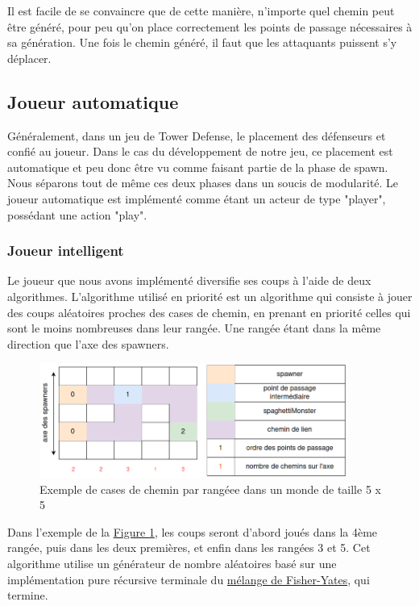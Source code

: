 \documentclass{article}
\begin{document}
Il est facile de se convaincre que de cette manière, n'importe quel chemin peut être généré, pour peu qu'on place correctement les points de passage nécessaires à sa génération.
Une fois le chemin généré, il faut que les attaquants puissent s'y déplacer.

\subsection{Joueur automatique}

Généralement, dans un jeu de Tower Defense, le placement des défenseurs et confié au joueur. Dans le cas du développement de notre jeu, ce placement est automatique et peu donc être vu comme faisant partie de la phase de spawn. Nous séparons tout de même ces deux phases dans un soucis de modularité.
Le joueur automatique est implémenté comme étant un acteur de type "player", possédant une action "play".

\subsubsection{Joueur intelligent}

Le joueur que nous avons implémenté diversifie ses coups à l'aide de deux algorithmes.
L'algorithme utilisé en priorité est un algorithme qui consiste à jouer des coups aléatoires proches des cases de chemin, en prenant en priorité celles qui sont le moins nombreuses dans leur rangée. Une rangée étant dans la même direction que l'axe des spawners.

\begin{figure}[H]
    \centering
    \includegraphics[width = 0.9\textwidth]{points_de_passage_play.png}
    \caption{Exemple de cases de chemin par rangéee dans un monde de taille 5 x 5}
    \label{fig:points de passage play}
\end{figure}

Dans l'exemple de la \hyperref[fig:points de passage play]{Figure \ref{fig:points de passage play}}, les coups seront d'abord joués dans la 4ème rangée, puis dans les deux premières, et enfin dans les rangées 3 et 5.
Cet algorithme utilise un générateur de nombre aléatoires basé sur une implémentation pure récursive terminale du \hyperlink{https://fr.wikipedia.org/wiki/Mélange_de_Fisher-Yates}{mélange de Fisher-Yates}, qui termine.
\end{document}
